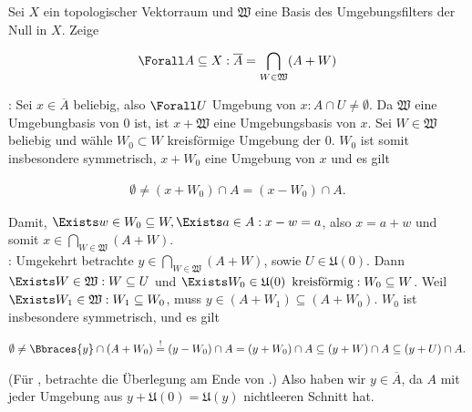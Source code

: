 \begin{exercise}

Sei $X$ ein topologischer Vektorraum und $\mathfrak{W}$ eine Basis des Umgebungsfilters der Null in $X$.
Zeige

\begin{align*}
  \Forall A \subseteq X:
  \overline{A} = \bigcap_{W \in \mathfrak{W}}(A + W)
\end{align*}

\end{exercise}

\begin{solution}

\Quote{$\subseteq$}:
Sei $x \in \overline{A}$ beliebig, also $\Forall U$ Umgebung von $x: A \cap U \neq \emptyset$.
Da $\mathfrak{W}$ eine Umgebungbasis von $0$ ist, ist $x + \mathfrak{W}$ eine Umgebungsbasis von $x$.
Sei $W \in \mathfrak{W}$ beliebig und wähle $W_0 \subset W$ kreisförmige Umgebung der $0$.
$W_0$ ist somit insbesondere symmetrisch, $x + W_0$ eine Umgebung von $x$ und es gilt

\begin{align*}
  \emptyset
  \neq
  (x + W_0) \cap A
  =
  (x - W_0) \cap A.
\end{align*}

Damit, $\Exists w \in W_0 \subseteq W, \Exists a \in A: x - w = a$, also $x = a + w$ und somit $x \in \bigcap_{W \in \mathfrak{W}}(A + W)$. \\

\Quote{$\supseteq$}:
Umgekehrt betrachte $y \in \bigcap_{W \in \mathfrak{W}}(A + W)$, sowie $ U \in \mathfrak{U}(0)$.
Dann $\Exists W \in \mathfrak{W}: W \subseteq U$ und $\Exists W_0 \in \mathfrak{U}(0) \enspace \text{kreisförmig}: W_0 \subseteq W$.
Weil $\Exists W_1 \in \mathfrak{W}: W_1 \subseteq W_0$, muss $y \in (A + W_1) \subseteq (A + W_0)$.
$W_0$ ist insbesondere symmetrisch, und es gilt

\begin{align*}
  \emptyset
  \neq
  \Bbraces{y} \cap (A + W_0)
  \stackrel{!}{=}
  (y - W_0) \cap A = (y + W_0) \cap A
  \subseteq
  (y + W) \cap A
  \subseteq
  (y + U) \cap A.
\end{align*}

(Für \Quote{!}, betrachte die Überlegung am Ende von \Quote{$\subseteq$}.)
Also haben wir $y \in \overline{A}$, da $A$ mit jeder Umgebung aus $y + \mathfrak{U}(0) = \mathfrak{U}(y)$ nichtleeren Schnitt hat.

\end{solution}
